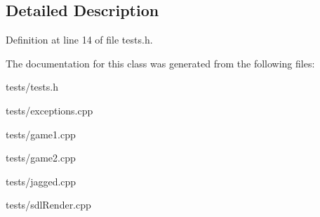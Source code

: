 \subsection{Detailed Description}


Definition at line 14 of file tests.\+h.



The documentation for this class was generated from the following files\+:\begin{DoxyCompactItemize}
\item 
tests/tests.\+h\item 
tests/exceptions.\+cpp\item 
tests/game1.\+cpp\item 
tests/game2.\+cpp\item 
tests/jagged.\+cpp\item 
tests/sdl\+Render.\+cpp\end{DoxyCompactItemize}
